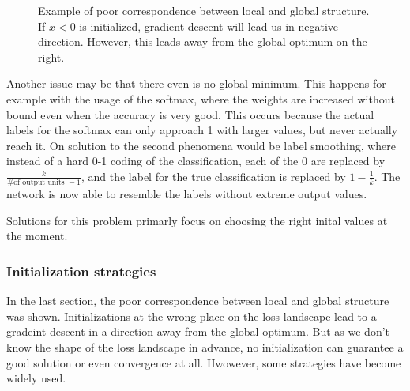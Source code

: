 \begin{figure}[h]\label{fig:Poor_correspondence}
    \begin{center}
        \caption{Example of poor correspondence between local and global
        structure. If $x<0$ is initialized, gradient descent will lead us in
        negative direction. However, this leads away from the global optimum
        on the right.}
    \end{center}
\end{figure}

Another issue may be that there even is no global minimum. This happens for
example with the usage of the softmax, where the weights are increased without
bound even when the accuracy is very good. This occurs because the actual labels
for the softmax can only approach 1 with larger values, but never actually reach
it.  On solution to the second phenomena would be label smoothing, where instead
of a hard 0-1 coding of the classification, each of the 0 are replaced by
$\frac{k}{\textrm{\# of output units }-1}$, and the label for the true
classification is replaced by $1-\frac{1}{k}$. The network is now able to
resemble the labels without extreme output values.

Solutions for this problem primarly focus on choosing the right inital values at
the moment.

\subsubsection{Initialization strategies}\label{sub:Initialization_strategies}
In the last section, the poor correspondence between local and global structure
was shown. Initializations at the wrong place on the loss landscape lead to a
gradeint descent in a direction away from the global optimum. But as we don't
know the shape of the loss landscape in advance, no initialization can guarantee
a good solution or even convergence at all. Hwowever, some strategies have
become widely used.

